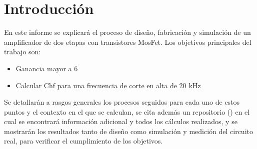 \section{Introducción}

En este informe se explicará el proceso de diseño, fabricación y simulación de un amplificador de dos etapas con transistores MosFet. Los objetivos principales del trabajo son:

\begin{itemize}
  \item Ganancia mayor a 6
  \item Calcular Chf para una frecuencia de corte en alta de 20 kHz
\end{itemize}

Se detallarán a rasgos generales los procesos seguidos para cada uno de estos puntos y el contexto en el que se calculan, se cita además un repositorio (\cite{Repositorio}) en el cual se encontrará información adicional y todos los cálculos realizados, y se mostrarán los resultados tanto de diseño como simulación y medición del circuito real, para verificar el cumplimiento de los objetivos.